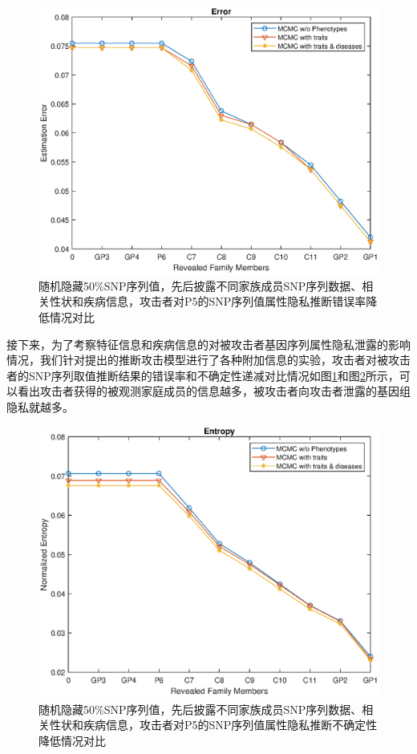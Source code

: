 \begin{figure}[htbp]
	\centering
	\includegraphics[width=0.8\linewidth]{./figures/P5error2.eps}
	\centering
	\caption{随机隐藏50\%SNP序列值，先后披露不同家族成员SNP序列数据、相关性状和疾病信息，攻击者对P5的SNP序列值属性隐私推断错误率降低情况对比}\label{fig:P5error2}
\end{figure}


接下来，为了考察特征信息和疾病信息的对被攻击者基因序列属性隐私泄露的影响情况，我们针对提出的推断攻击模型进行了各种附加信息的实验，攻击者对被攻击者的SNP序列取值推断结果的错误率和不确定性递减对比情况如图\ref{fig:P5error2}和图\ref{fig:P5entropy2}所示，可以看出攻击者获得的被观测家庭成员的信息越多，被攻击者向攻击者泄露的基因组隐私就越多。

\begin{figure}[htbp]
	\centering
	\includegraphics[width=0.8\linewidth]{./figures/P5entropy2.eps}
	\centering
	\caption{随机隐藏50\%SNP序列值，先后披露不同家族成员SNP序列数据、相关性状和疾病信息，攻击者对P5的SNP序列值属性隐私推断不确定性降低情况对比}\label{fig:P5entropy2}
\end{figure}


